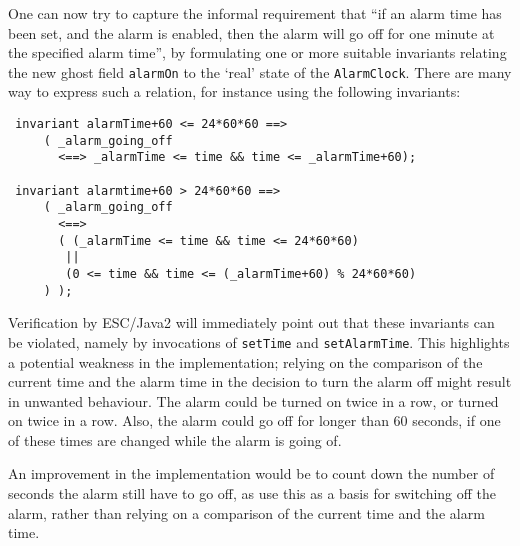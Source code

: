 \documentclass{llncs}
\begin{document}
% 

One can now try to capture the informal requirement that ``if an alarm time
has been set, and the alarm is enabled, then the alarm will go off for
one minute at the specified alarm time'', by formulating one or more
suitable invariants relating the new ghost field \texttt{alarmOn} to
the `real' state of the \texttt{AlarmClock}. There are many way to express
such a relation, for instance using the following invariants:
\begin{verbatim}
 invariant alarmTime+60 <= 24*60*60 ==> 
     ( _alarm_going_off 
       <==> _alarmTime <= time && time <= _alarmTime+60);

 invariant alarmtime+60 > 24*60*60 ==> 
     ( _alarm_going_off 
       <==> 
       ( (_alarmTime <= time && time <= 24*60*60)
        ||
        (0 <= time && time <= (_alarmTime+60) % 24*60*60) 
     ) );
\end{verbatim}
Verification by ESC/Java2 will immediately point out that these invariants
can be violated,
namely by invocations of \texttt{setTime} and  \texttt{setAlarmTime}.
This highlights a potential weakness in the implementation;
relying on the comparison of the current time and the alarm time
in the decision to turn the alarm off might result in unwanted behaviour. 
The alarm could be turned on twice in a row, or turned on twice in a row.
Also, the alarm could go off for longer than 60 seconds, if one of these times 
are changed while the alarm is going of.  


An improvement in the implementation would be to count down the number of 
seconds the alarm still have to go off, as use this as a basis for switching 
off the alarm, rather than relying on a comparison of the current time 
and the alarm time.
\end{document}
